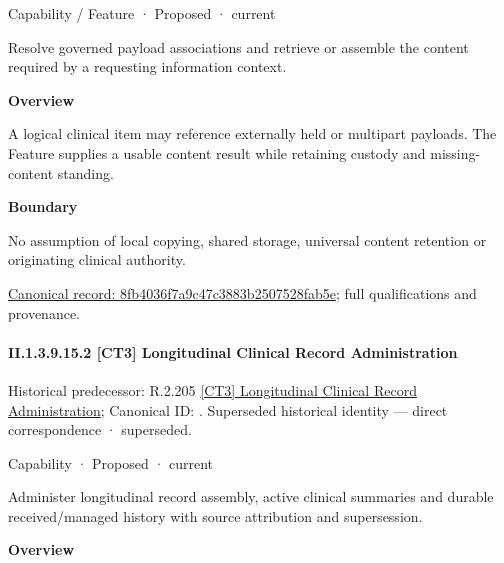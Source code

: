 \label{element:8fb4036f7a9c47c3883b2507528fab5e}
{\small Capability / Feature · Proposed · current}\par

Resolve governed payload associations and retrieve or assemble the content required by a requesting information context.



\textbf{Overview}



A logical clinical item may reference externally held or multipart payloads. The Feature supplies a usable content result while retaining custody and missing-content standing.



\textbf{Boundary}



No assumption of local copying, shared storage, universal content retention or originating clinical authority.


{\footnotesize \href{../../../../continuum/strategy/capability/feature/8fb4036f7a9c47c3883b2507528fab5e.md}{Canonical record: 8fb4036f7a9c47c3883b2507528fab5e}; full qualifications and provenance.}\par
\paragraph*{II.1.3.9.15.2 [CT3] Longitudinal Clinical Record Administration}
\label{navigation:II.1.3.9.15.2}

{\small Historical predecessor: R.2.205 \hyperref[element:bd91d848cf424c42bec7c80cd32edd28]{[CT3] Longitudinal Clinical Record Administration}; Canonical ID: \texttt{}. Superseded historical identity — direct correspondence · superseded.}\par
\label{element:14748dc6117f4b6ba7c0fc554b76bd89}
{\small Capability · Proposed · current}\par

Administer longitudinal record assembly, active clinical summaries and durable received/managed history with source attribution and supersession.



\textbf{Overview}



